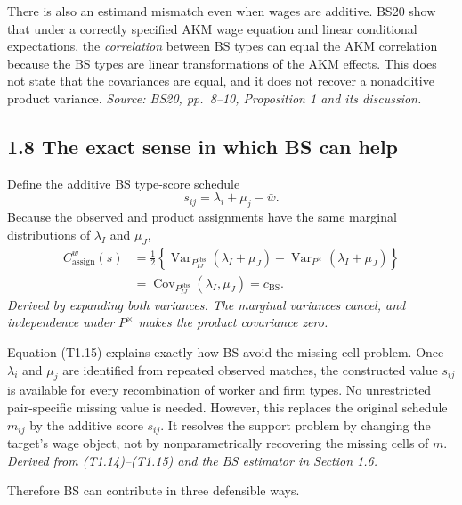 \documentclass[11pt]{article}
\begin{document}
There is also an estimand mismatch even when wages are additive.  BS20 show
that under a correctly specified AKM wage equation and linear conditional
expectations, the \emph{correlation} between BS types can equal the AKM
correlation because the BS types are linear transformations of the AKM
effects.  This does not state that the covariances are equal, and it does not
recover a nonadditive product variance.
\textit{Source: BS20, pp.\ 8--10, Proposition 1 and its discussion.}

\subsection{1.8 The exact sense in which BS can help}

Define the additive BS type-score schedule
\[
s_{ij}=\lambda_i+\mu_j-\bar w.
\tag{T1.14}
\]
Because the observed and product assignments have the same marginal
distributions of \(\lambda_I\) and \(\mu_J\),
\[
\begin{aligned}
C^w_{\mathrm{assign}}(s)
&=\frac12\left\{
\operatorname{Var}_{P^{\mathrm{obs}}_{IJ}}(\lambda_I+\mu_J)
-\operatorname{Var}_{P^\times}(\lambda_I+\mu_J)
\right\}\\
&=\operatorname{Cov}_{P^{\mathrm{obs}}_{IJ}}
(\lambda_I,\mu_J)
=c_{\mathrm{BS}}.
\end{aligned}
\tag{T1.15}
\]
\textit{Derived by expanding both variances.  The marginal variances cancel,
and independence under \(P^\times\) makes the product covariance zero.}

Equation (T1.15) explains exactly how BS avoid the missing-cell problem.  Once
\(\lambda_i\) and \(\mu_j\) are identified from repeated observed matches, the
constructed value \(s_{ij}\) is available for every recombination of worker
and firm types.  No unrestricted pair-specific missing value is needed.
However, this replaces the original schedule \(m_{ij}\) by the additive score
\(s_{ij}\).  It resolves the support problem by changing the target's wage
object, not by nonparametrically recovering the missing cells of \(m\).
\textit{Derived from (T1.14)--(T1.15) and the BS estimator in
Section 1.6.}

Therefore BS can contribute in three defensible ways.
\end{document}
